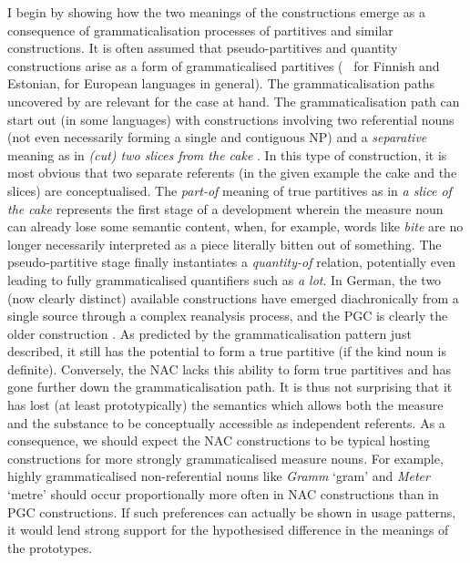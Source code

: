 I begin by showing how the two meanings of the constructions emerge as a consequence of grammaticalisation processes of partitives and similar constructions.
It is often assumed that pseudo-partitives and quantity constructions arise as a form of grammaticalised partitives (\eg\ \citealp[536--539]{Koptjevskaja2001} for Finnish and Estonian, \citealp[559]{Koptjevskaja2001} for European languages in general).
The grammaticalisation paths uncovered by \citet[esp.\ 526--530]{Koptjevskaja2001} are relevant for the case at hand.
The grammaticalisation path can start out (in some languages) with constructions involving two referential nouns (not even necessarily forming a single and contiguous NP) and a \textit{separative} meaning as in \textit{(cut) two slices from the cake} \citep[535]{Koptjevskaja2001}.
In this type of construction, it is most obvious that two separate referents (in the given example the cake and the slices) are conceptualised.
The \textit{part-of} meaning of true partitives as in \textit{a slice of the cake} represents the first stage of a development wherein the measure noun can already lose some semantic content, when, for example, words like \textit{bite} are no longer necessarily interpreted as a piece literally bitten out of something.
The pseudo-partitive stage finally instantiates a \textit{quantity-of} relation, potentially even leading to fully grammaticalised quantifiers such as \textit{a lot}.
In German, the two (now clearly distinct) available constructions have emerged diachronically from a single source through a complex reanalysis process, and the PGC is clearly the older construction \citep[2--4]{Zimmer2015}.
As predicted by the grammaticalisation pattern just described, it still has the potential to form a true partitive (if the kind noun is definite).
Conversely, the NAC lacks this ability to form true partitives and has gone further down the grammaticalisation path.
It is thus not surprising that it has lost (at least prototypically) the semantics which allows both the measure and the substance to be conceptually accessible as independent referents.
As a consequence, we should expect the NAC constructions to be typical hosting constructions for more strongly grammaticalised measure nouns.
For example, highly grammaticalised non-referential nouns like \textit{Gramm} `gram' and \textit{Meter} `metre' should occur proportionally more often in NAC constructions than in PGC constructions.
If such preferences can actually be shown in usage patterns, it would lend strong support for the hypothesised difference in the meanings of the prototypes.
